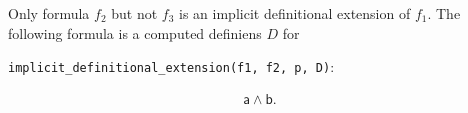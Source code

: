 \documentclass[a4paper]{article}
\newcounter{def}
\begin{document}
Only formula $f_2$ but not $f_3$ is an implicit definitional extension of $f_1$.
The following formula is a computed definiens $D$ for
\begin{center}
\texttt{implicit\_definitional\_extension(f1, f2, p, D)}:
\end{center}

\[\begin{array}{lllll}
\mathsf{a} \land  \mathsf{b}.
\end{array}
\]
%
%


\printindex
\end{document}
